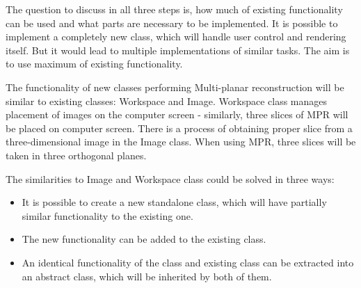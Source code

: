 The question to discuss in all three steps is, how much of existing functionality can be used and what parts are necessary to be implemented. It is possible to implement a completely new class, which will handle user control and rendering itself. But it would lead to multiple implementations of similar tasks. The aim is to use maximum of existing functionality.

The functionality of new classes performing Multi-planar reconstruction will be similar to existing classes: Workspace and Image. Workspace class manages placement of images on the computer screen - similarly, three slices of MPR will be placed on computer screen. There is a process of obtaining proper slice from a three-dimensional image in the Image class. When using MPR, three slices will be taken in three orthogonal planes.

The similarities to Image and Workspace class could be solved in three ways:

\begin{itemize}
\item It is possible to create a new standalone class, which will have partially similar functionality to the existing one.
\item The new functionality can be added to the existing class.
\item An identical functionality of the class and existing class can be extracted into an abstract class, which will be inherited by both of them.
\end{itemize}



